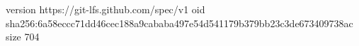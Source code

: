 version https://git-lfs.github.com/spec/v1
oid sha256:6a58eccc71dd46cec188a9cababa497e54d541179b379bb23c3de673409738ac
size 704
